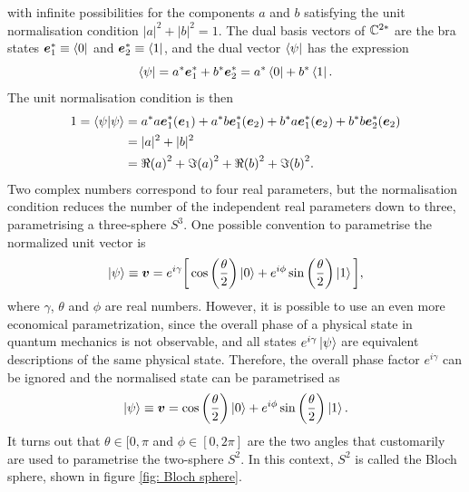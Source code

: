 \begin{ex}
    with infinite possibilities for the components $a$ and $b$ satisfying the unit normalisation condition $|a|^2 + |b|^2 = 1$. The dual basis vectors of $\mathbb{C}^{2*}$ are the bra states $\bm{e}_1^* \equiv \bra{0}$ and $\bm{e}_2^* \equiv \bra{1}$, and the dual vector $\bra{\psi}$ has the expression
    \begin{equation}
        \bra{\psi} = a^*\bm{e}_1^* + b^*\bm{e}_2^* = a^*\bra{0} + b^*\bra{1}.
    \end{equation}
    The unit normalisation condition is then
    \begin{equation}
        \begin{split}
            1 = \langle \psi | \psi \rangle &= a^*a\bm{e}_1^*(\bm{e}_1) + a^*b\bm{e}_1^*(\bm{e}_2) + b^*a\bm{e}_1^*(\bm{e}_2) + b^*b\bm{e}_2^*(\bm{e}_2) \\
            &= |a|^2 + |b|^2 \\
            &= \Re{(a)}^2 + \Im{(a)}^2 + \Re{(b)}^2 + \Im{(b)}^2.
        \end{split}
    \end{equation}
    Two complex numbers correspond to four real parameters, but the normalisation condition reduces the number of the independent real parameters down to three, parametrising a three-sphere $S^3$. One possible convention to parametrise the normalized unit vector is 
    \begin{equation}
        \ket{\psi} \equiv \bm{v} = e^{i\gamma}\bigg[\cos{\bigg(\frac{\theta}{2}\bigg)}\ket{0} + e^{i\phi}\sin{\bigg(\frac{\theta}{2}\bigg)}\ket{1}\bigg],
    \end{equation}
    where $\gamma$, $\theta$ and $\phi$ are real numbers. However, it is possible to use an even more economical parametrization, since the overall phase of a physical state in quantum mechanics is not observable, and all states $e^{i\gamma}\ket{\psi}$ are equivalent descriptions of the same physical state. Therefore, the overall phase factor $e^{i\gamma}$ can be ignored and the normalised state can be parametrised as
    \begin{equation}
        \ket{\psi} \equiv \bm{v} = \cos{\bigg(\frac{\theta}{2}\bigg)}\ket{0} + e^{i\phi}\sin{\bigg(\frac{\theta}{2}\bigg)}\ket{1}.
    \end{equation}
    It turns out that $\theta \in [0,\pi$ and $\phi \in [0,2\pi]$ are the two angles that customarily are used to parametrise the two-sphere $S^2$. In this context, $S^2$ is called the Bloch sphere, shown in figure \ref{fig: Bloch sphere}.
    \begin{figure}[h]
        \centering

\end{figure}
\end{ex}
